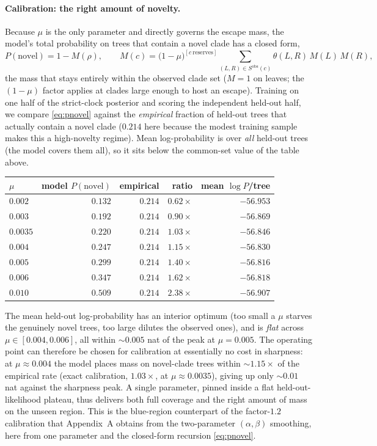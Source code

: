 \documentclass{article}
\begin{document}
\paragraph{Calibration: the right amount of novelty.}
Because $\mu$ is the only parameter and directly governs the escape mass, the model's
total probability on trees that contain a novel clade has a closed form,
\begin{equation}
  P(\text{novel})=1-M(\rho),\qquad
  M(c)=\bigl(1-\mu\bigr)^{[c\ \text{reserves}]}
        \!\!\!\sum_{(L,R)\in S^{\mathrm{obs}}(c)}\!\!\! \theta(L,R)\,M(L)\,M(R),
  \label{eq:pnovel}
\end{equation}
the mass that stays entirely within the observed clade set ($M=1$ on leaves; the
$(1-\mu)$ factor applies at clades large enough to host an escape). Training on one
half of the strict-clock posterior and scoring the independent held-out half, we
compare \eqref{eq:pnovel} against the \emph{empirical} fraction of held-out trees
that actually contain a novel clade ($0.214$ here because the modest training sample
makes this a high-novelty regime). Mean log-probability is over \emph{all}
held-out trees (the model covers them all), so it sits below the common-set value
of the table above.
\begin{center}
\renewcommand{\arraystretch}{1.1}
\begin{tabular}{lrrrr}
\hline
$\mu$ & model $P(\text{novel})$ & empirical & ratio & mean $\log P$/tree \\
\hline
$0.002$  & $0.132$ & $0.214$ & $0.62\times$ & $-56.953$ \\
$0.003$  & $0.192$ & $0.214$ & $0.90\times$ & $-56.869$ \\
$0.0035$ & $0.220$ & $0.214$ & $1.03\times$ & $-56.846$ \\
$\mathbf{0.004}$  & $\mathbf{0.247}$ & $0.214$ & $\mathbf{1.15\times}$ & $-56.830$ \\
$0.005$  & $0.299$ & $0.214$ & $1.40\times$ & $\mathbf{-56.816}$ \\
$0.006$  & $0.347$ & $0.214$ & $1.62\times$ & $-56.818$ \\
$0.010$  & $0.509$ & $0.214$ & $2.38\times$ & $-56.907$ \\
\hline
\end{tabular}
\end{center}
The mean held-out log-probability has an interior optimum (too small a $\mu$ starves
the genuinely novel trees, too large dilutes the observed ones), and is \emph{flat}
across $\mu\in[0.004,0.006]$, all within $\sim 0.005$ nat of the peak at $\mu=0.005$.
The operating point can therefore be chosen for calibration at essentially no cost in
sharpness: at $\mu\approx 0.004$ the model places mass on novel-clade trees within
$\sim\!1.15\times$ of the empirical rate (exact calibration, $1.03\times$, at
$\mu\approx 0.0035$), giving up only $\sim 0.01$ nat against the sharpness peak. A
single parameter, pinned inside a flat held-out-likelihood plateau, thus delivers
both full coverage and the right amount of mass on the unseen region. This is the
blue-region counterpart of the factor-$1.2$ calibration that
Appendix~A obtains from the two-parameter $(\alpha,\beta)$ smoothing, here from one
parameter and the closed-form recursion \eqref{eq:pnovel}.
\end{document}
